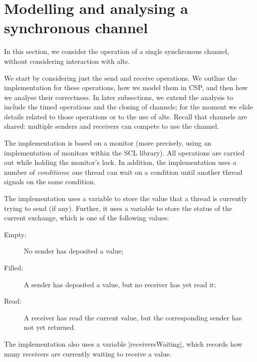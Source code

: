 \section{Modelling and analysing a  synchronous channel}
\label{sec:syncchan}

\inlineScala

In this section, we consider the operation of a single synchronous channel,
without considering interaction with alts.

We start by considering just the send and receive operations.  We outline the
implementation for these operations, how we model them in CSP, and then how we
analyse their correctness.  In later subsections, we extend the analysis to
include the timed operations and the closing of channels; for the moment we
elide details related to those operations or to the use of alts.  Recall that
channels are shared: multiple senders and receivers can compete to use the
channel.

The implementation is based on a monitor (more precisely, using an
implementation of monitors within the SCL library).  All operations are
carried out while holding the monitor's lock.  In addition, the implementation
uses a number of \emph{conditions}: one thread can wait on a condition until
another thread signals on the same condition.

The implementation uses a variable  to store the value that a
thread is currently trying to send (if any).  Further, it uses a variable
 to store the status of the current exchange, which is one of
the following values:
%
\begin{description}
\item[{\scalastyle Empty}:] No sender has deposited a value;
\item[{\scalastyle Filled}:] A sender has deposited a value, but no receiver
  has yet read it;
\item[{\scalastyle Read}:] A receiver has read the current value, but the
  corresponding sender has not yet returned.
\end{description}
%
The implementation also uses a variable |receiversWaiting|, which records how
many receivers are currently waiting to receive a value. 


